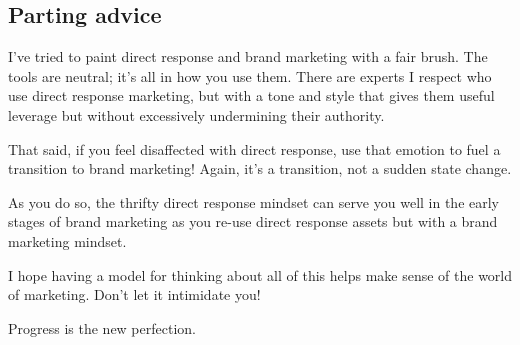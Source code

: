 \documentclass[13pt,]{tufte-handout}
\begin{document}
\hypertarget{parting-advice}{%
\subsection{Parting advice}\label{parting-advice}}

I've tried to paint direct response and brand marketing with a fair
brush. The tools are neutral; it's all in how you use them. There are
experts I respect who use direct response marketing, but with a tone and
style that gives them useful leverage but without excessively
undermining their authority.

That said, if you feel disaffected with direct response, use that
emotion to fuel a transition to brand marketing! Again, it's a
transition, not a sudden state change.

As you do so, the thrifty direct response mindset can serve you well in
the early stages of brand marketing as you re-use direct response assets
but with a brand marketing mindset.

I hope having a model for thinking about all of this helps make sense of
the world of marketing. Don't let it intimidate you!

Progress is the new perfection.
\end{document}
